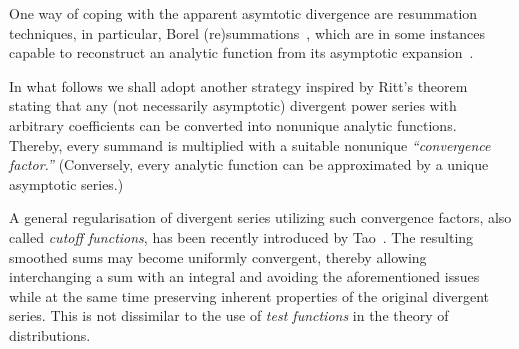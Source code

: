 \documentclass[%
  twocolumn,
 showpacs,
 showkeys,
 preprintnumbers,
 amsmath,amssymb,
 aps,
  pra,
  longbibliography,
 ]{revtex4-1}
\begin{document}
One way of coping with the apparent asymtotic divergence are resummation techniques,
in particular, Borel (re)summations~\cite{Boyd99thedevil,rousseau-2004,Helling-2012,Costin-2009,ZINNJUSTIN20101454,Costin_Dunne_2017},
which are in some instances capable to reconstruct an analytic function
from its asymptotic expansion~\cite{Bruning-1996}.

In what follows we shall adopt another strategy inspired by Ritt's theorem~\cite{Pittnauer-73,Remmert-1991-tocf}
stating that any (not necessarily asymptotic) divergent power series with arbitrary coefficients can
be converted into nonunique analytic functions. Thereby, every summand is
multiplied with a suitable nonunique {\em ``convergence factor.''}
(Conversely, every analytic function can be approximated by a unique asymptotic series.)

A general regularisation
of divergent series  utilizing such convergence factors,
also called {\em cutoff functions}, has been recently introduced by
Tao~\cite[Section~3.7]{Tao-2013}.
The resulting smoothed sums may become uniformly convergent, thereby
allowing interchanging a sum with an integral
and avoiding the aforementioned issues while at the same time preserving
inherent properties of the original divergent series.
This is not dissimilar to the use of {\em test functions} in the theory of distributions.
\end{document}
